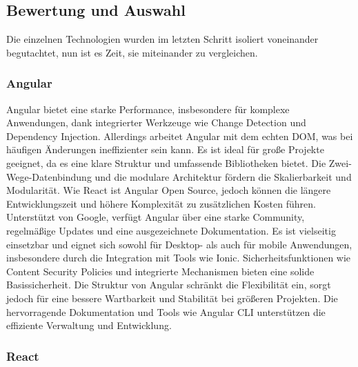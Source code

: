 \subsection{Bewertung und Auswahl}

Die einzelnen Technologien wurden im letzten Schritt isoliert voneinander begutachtet, nun ist es Zeit, sie miteinander zu vergleichen.

\subsubsection{Angular}

Angular bietet eine starke Performance, insbesondere für komplexe Anwendungen, dank integrierter Werkzeuge wie Change Detection und Dependency Injection. Allerdings arbeitet Angular mit dem echten DOM, was bei häufigen Änderungen ineffizienter sein kann. Es ist ideal für große Projekte geeignet, da es eine klare Struktur und umfassende Bibliotheken bietet. \newline
Die Zwei-Wege-Datenbindung und die modulare Architektur fördern die Skalierbarkeit und Modularität. Wie React ist Angular Open Source, jedoch können die längere Entwicklungszeit und höhere Komplexität zu zusätzlichen Kosten führen. Unterstützt von Google, verfügt Angular über eine starke Community, regelmäßige Updates und eine ausgezeichnete Dokumentation. Es ist vielseitig einsetzbar und eignet sich sowohl für Desktop- als auch für mobile Anwendungen, insbesondere durch die Integration mit Tools wie Ionic. Sicherheitsfunktionen wie Content Security Policies und integrierte Mechanismen bieten eine solide Basissicherheit. Die Struktur von Angular schränkt die Flexibilität ein, sorgt jedoch für eine bessere Wartbarkeit und Stabilität bei größeren Projekten. Die hervorragende Dokumentation und Tools wie Angular CLI unterstützen die effiziente Verwaltung und Entwicklung.\textit{\cite{madurapperuma2022state, rathinam2022analysis}}

\subsubsection{React}

